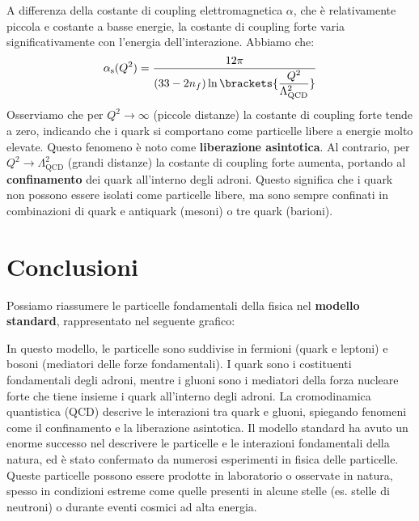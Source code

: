 
A differenza della costante di coupling elettromagnetica $\alpha$, che è relativamente piccola e costante a basse energie, la costante di coupling forte varia significativamente con l'energia dell'interazione. Abbiamo che:
\begin{equation}
    \alpha_{\text{s}}(Q^2) = \dfrac{12 \pi}{(33 - 2 n_f) \ln\brackets{\dfrac{Q^2}{\Lambda_{\text{QCD}}^2}}}
\end{equation}
Osserviamo che per $Q^2 \to \infty$ (piccole distanze) la costante di coupling forte tende a zero, indicando che i quark si comportano come particelle libere a energie molto elevate. Questo fenomeno è noto come \textbf{liberazione asintotica}. Al contrario, per $Q^2 \to \Lambda_{\text{QCD}}^2$ (grandi distanze) la costante di coupling forte aumenta, portando al \textbf{confinamento} dei quark all'interno degli adroni. Questo significa che i quark non possono essere isolati come particelle libere, ma sono sempre confinati in combinazioni di quark e antiquark (mesoni) o tre quark (barioni).
\section{Conclusioni}
Possiamo riassumere le particelle fondamentali della fisica nel \textbf{modello standard}, rappresentato nel seguente grafico:


In questo modello, le particelle sono suddivise in fermioni (quark e leptoni) e bosoni (mediatori delle forze fondamentali). I quark sono i costituenti fondamentali degli adroni, mentre i gluoni sono i mediatori della forza nucleare forte che tiene insieme i quark all'interno degli adroni. La cromodinamica quantistica (QCD) descrive le interazioni tra quark e gluoni, spiegando fenomeni come il confinamento e la liberazione asintotica. Il modello standard ha avuto un enorme successo nel descrivere le particelle e le interazioni fondamentali della natura, ed è stato confermato da numerosi esperimenti in fisica delle particelle.\\
Queste particelle possono essere prodotte in laboratorio o osservate in natura, spesso in condizioni estreme come quelle presenti in alcune stelle (es. stelle di neutroni) o durante eventi cosmici ad alta energia.

